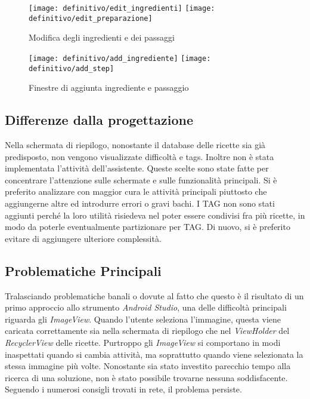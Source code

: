 \begin{figure}[ht]
  \begin{center}
    \texttt{[image: definitivo/edit\_ingredienti]}
    \texttt{[image: definitivo/edit\_preparazione]}
    \caption{Modifica degli ingredienti e dei passaggi}
    \label{fig:def_edit_ricetta}
  \end{center}
\end{figure}

\begin{figure}[ht]
  \begin{center}
    \texttt{[image: definitivo/add\_ingrediente]}
    \texttt{[image: definitivo/add\_step]}
    \caption{Finestre di aggiunta ingrediente e passaggio}
    \label{fig:def_edit_ricetta_1}
  \end{center}
\end{figure}

\clearpage
\subsection{Differenze dalla progettazione}
Nella schermata di riepilogo, nonostante il database delle ricette sia già predisposto, non vengono visualizzate difficoltà e tags.
Inoltre non è stata implementata l'attività dell'assistente.
Queste scelte sono state fatte per concentrare l'attenzione sulle schermate e sulle funzionalità principali.
Si è preferito analizzare con maggior cura le attività principali piuttosto che aggiungerne altre ed introdurre errori o gravi bachi.
I TAG non sono stati aggiunti perché la loro utilità risiedeva nel poter essere condivisi fra più ricette, in modo da poterle eventualmente partizionare per TAG.
Di nuovo, si è preferito evitare di aggiungere ulteriore complessità.

\subsection{Problematiche Principali}
Tralasciando problematiche banali o dovute al fatto che questo è il risultato di un primo approccio allo strumento \textit{Android Studio}, una delle difficoltà principali riguarda gli \textit{ImageView}.
Quando l'utente seleziona l'immagine, questa viene caricata correttamente sia nella schermata di riepilogo che nel \textit{ViewHolder} del \textit{RecyclerView} delle ricette. 
Purtroppo gli \textit{ImageView} si comportano in modi inaspettati quando si cambia attività, ma soprattutto quando viene selezionata la stessa immagine più volte.
Nonostante sia stato investito parecchio tempo alla ricerca di una soluzione, non è stato possibile trovarne nessuna soddisfacente.
Seguendo i numerosi consigli trovati in rete, il problema persiste.

